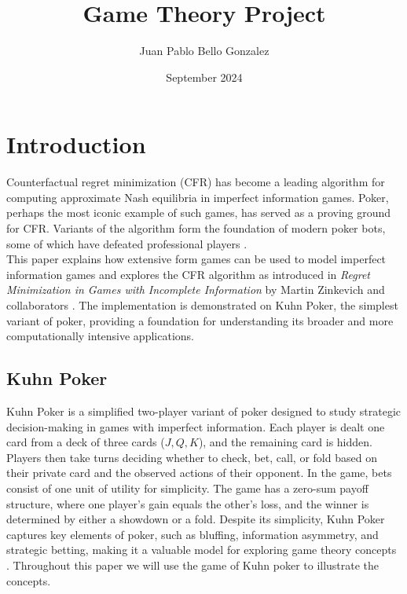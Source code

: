 \documentclass{article}
\title{Game Theory Project}
\author{Juan Pablo Bello Gonzalez}
\date{September 2024}
\begin{document}
\maketitle

\newpage




\section{Introduction}

Counterfactual regret minimization (CFR) has become a leading algorithm for computing approximate Nash equilibria in imperfect information games. Poker, perhaps the most iconic example of such games, has served as a proving ground for CFR. Variants of the algorithm form the foundation of modern poker bots, some of which have defeated professional players \cite{Int8}.\\  

This paper explains how extensive form games can be used to model imperfect information games and explores the CFR algorithm as introduced in \textit{Regret Minimization in Games with Incomplete Information} by Martin Zinkevich and collaborators \cite{Zinkevich}. The implementation is demonstrated on Kuhn Poker, the simplest variant of poker, providing a foundation for understanding its broader and more computationally intensive applications.


\subsection{Kuhn Poker}

Kuhn Poker is a simplified two-player variant of poker designed to study strategic decision-making in games with imperfect information. Each player is dealt one card from a deck of three cards (\(J, Q, K\)), and the remaining card is hidden. Players then take turns deciding whether to check, bet, call, or fold based on their private card and the observed actions of their opponent. In the game, bets consist of one unit of utility for simplicity. The game has a zero-sum payoff structure, where one player's gain equals the other's loss, and the winner is determined by either a showdown or a fold. Despite its simplicity, Kuhn Poker captures key elements of poker, such as bluffing, information asymmetry, and strategic betting, making it a valuable model for exploring game theory concepts \cite{Farina}. Throughout this paper we will use the game of Kuhn poker to illustrate the concepts. 
\end{document}
